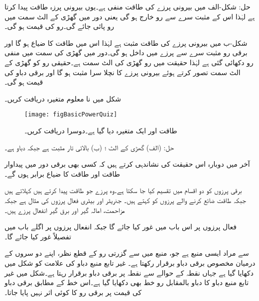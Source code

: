 حل: شکل-الف میں بیرونی پرزے کی طاقت منفی ہے۔یوں بیرونی پرزہ طاقت پیدا کرتا ہے لہٰذا اس کے مثبت سرے سے رو خارج ہو گی یعنی دور میں گھڑی کے الٹ سمت میں رو پائی جائے گی۔رو کی قیمت  ہو گی۔

شکل-ب میں بیرونی پرزے کی طاقت مثبت ہے لہٰذا اس میں طاقت کا ضیاع ہو گا اور برقی رو مثبت سرے سے پرزے میں داخل ہو گی۔دور میں گھڑی کی سمت میں منفی رو دکھائی گئی ہے لہٰذا حقیقت میں رو گھڑی کی الٹ سمت ہے۔حقیقی رو کو گھڑی کے الٹ سمت تصور کرتے ہوئے  بیرونی پرزے کا نچلا سرا مثبت ہو گا اور برقی دباو کی قیمت  ہو گی۔

شکل  میں نا معلوم متغیرہ دریافت کریں۔ 
\begin{figure}
\centering
\texttt{[image: figBasicPowerQuiz]}
\caption{طاقت اور ایک متغیرہ دیا گیا ہے۔دوسرا دریافت کریں۔}
\label{شکل_بنیادی_طاقت_مشق}
\end{figure}

حل: (الف) گھڑی کے الٹ ؛ (ب) بالائی تار مثبت ہے جبکہ دباو  ہے۔  

آخر میں دوبارہ اس حقیقت کی نشاندہی کرتے ہیں کہ کسی بھی برقی دور میں پیداوار طاقت اور طاقت کا ضیاع برابر ہوں گے۔

برقی پرزوں کو دو اقسام میں تقسیم کیا جا سکتا ہے۔وہ پرزے جو طاقت پیدا کرتے ہیں  کہلاتے ہیں جبکہ طاقت ضائع کرنے والے پرزوں کو  کہتے ہیں۔ جنریٹر اور بیٹری فعال پرزوں کی مثال ہے جبکہ مزاحمت، امالہ گیر اور برق گیر انفعال پرزے ہیں۔

فعال پرزوں پر اس باب میں غور کیا جائے گا جبکہ انفعال پرزوں پر اگلے باب میں تفصیلاً غور کیا جائے گا۔ 

 سے مراد ایسی منبع ہے جو، منبع میں سے گزرتی رو کے قطع نظر، اپنے دو سروں کے درمیان مخصوص برقی دباو برقرار رکھتا ہے۔ غیر تابع منبع دباو کی علامت کو شکل  میں دکھایا گیا ہے جہاں نقطہ  کے حوالے سے نقطہ  پر  برقی دباو برقرار رہتا ہے۔شکل میں غیر تابع منبع دباو کا دباو بالمقابل رو   خط بھی دکھایا گیا ہے۔اس خط کے مطابق برقی دباو کی قیمت پر برقی رو کا کوئی اثر نہیں پایا جاتا۔

